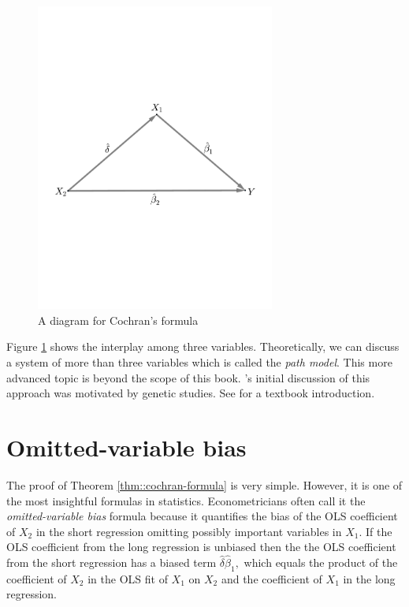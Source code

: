 \begin{figure}
\centering
\includegraphics[width = 0.7\textwidth]{figures/cochrangraph.pdf}
\caption{A diagram for Cochran's formula}\label{fig::cochranformula}
\end{figure} 



Figure \ref{fig::cochranformula} shows the interplay among three variables. Theoretically, we can discuss a system of more than three variables which is called the {\it path model}. This more advanced topic is beyond the scope of this book. \citet{sewall1921correlation, wright1934method}'s initial discussion of this approach was motivated by genetic studies. See \citet{freedman2009statistical} for a textbook introduction. 



 
\section{Omitted-variable bias} 
\label{sec::ovb}


The proof of Theorem \ref{thm::cochran-formula} is very simple. However, it is one of the most insightful formulas in statistics. Econometricians often call it the {\it omitted-variable bias} formula because it quantifies the bias of the OLS coefficient of $X_2$ in the short regression omitting possibly important variables in $X_1$.  If the OLS coefficient from the long regression is unbiased then the the OLS coefficient from the short regression has a biased term
$
 \hat{\delta} \hat{\beta}_1,
$
which equals the product of the coefficient of $X_2$ in the OLS fit of $X_1$ on $X_2$ and the coefficient of $X_1$ in the long regression. 



